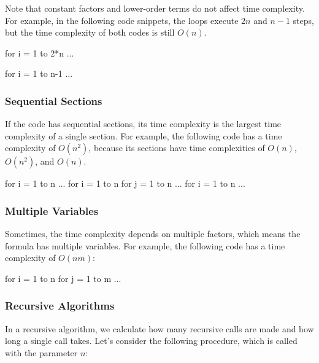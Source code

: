 
Note that constant factors and lower-order terms do not affect time complexity.
For example, in the following code snippets, the loops execute $2n$ and $n-1$ steps,
but the time complexity of both codes is still $O(n)$.

\begin{code}
    for i = 1 to 2*n
    ...
\end{code}

\begin{code}
    for i = 1 to n-1
    ...
\end{code}




\subsubsection{Sequential Sections}

If the code has sequential sections, its time complexity is the largest
time complexity of a single section. For example, the following code has a time complexity of $O(n^2)$,
because its sections have time complexities of $O(n)$, $O(n^2)$, and $O(n)$.

\begin{code}
    for i = 1 to n
    ...
    for i = 1 to n
    for j = 1 to n
    ...
    for i = 1 to n
    ...
\end{code}

\subsubsection{Multiple Variables}

Sometimes, the time complexity depends on multiple factors,
which means the formula has multiple variables.
For example, the following code has a time complexity of $O(nm)$:

\begin{code}
    for i = 1 to n
    for j = 1 to m
    ...
\end{code}

\subsubsection{Recursive Algorithms}

In a recursive algorithm, we calculate
how many recursive calls are made and how long
a single call takes.
Let's consider the following
procedure, which is called with the parameter $n$:

